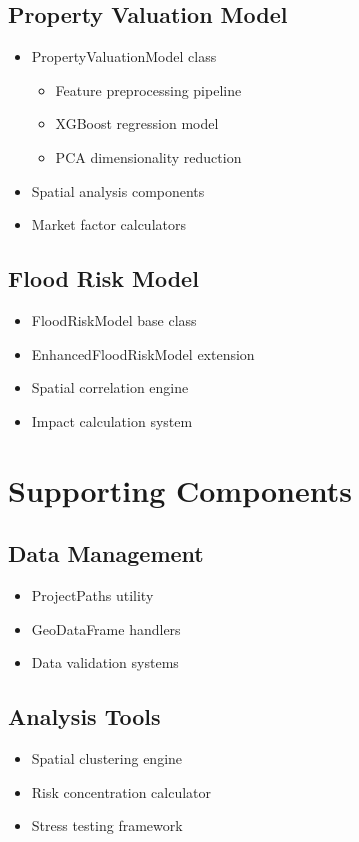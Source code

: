 \documentclass{article}
\begin{document}
\subsection{Property Valuation Model}
\begin{itemize}
    \item PropertyValuationModel class
        \begin{itemize}
            \item Feature preprocessing pipeline
            \item XGBoost regression model
            \item PCA dimensionality reduction
        \end{itemize}
    \item Spatial analysis components
    \item Market factor calculators
\end{itemize}

\subsection{Flood Risk Model}
\begin{itemize}
    \item FloodRiskModel base class
    \item EnhancedFloodRiskModel extension
    \item Spatial correlation engine
    \item Impact calculation system
\end{itemize}

\section{Supporting Components}

\subsection{Data Management}
\begin{itemize}
    \item ProjectPaths utility
    \item GeoDataFrame handlers
    \item Data validation systems
\end{itemize}

\subsection{Analysis Tools}
\begin{itemize}
    \item Spatial clustering engine
    \item Risk concentration calculator
    \item Stress testing framework
\end{itemize}
\end{document}
